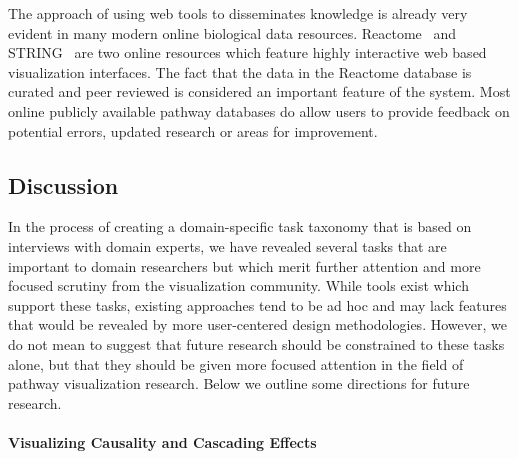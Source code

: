 \documentclass[twocolumn]{bmcart}%
\begin{document}
The approach of using web tools to disseminates knowledge is already very evident in many modern online biological data resources.
Reactome~\cite{croft2014reactome} and STRING~\cite{STRING2005} are two online resources which feature highly interactive web based visualization interfaces.
The fact that the data in the Reactome database is curated and peer reviewed is considered an important feature of the system.
Most online publicly available pathway databases do allow users to provide feedback on potential errors, updated research or areas for improvement.

\subsection*{Discussion}

In the process of creating a domain-specific task taxonomy that is based on interviews with domain experts, we have revealed several tasks that are important to domain researchers but which merit further attention and more focused scrutiny from the visualization community.
While tools exist which support these tasks, existing approaches tend to be ad hoc and may lack features that would be revealed by more user-centered design methodologies.
However, we do not mean to suggest that future research should be constrained to these tasks alone, but that they should be given more focused attention in the field of pathway visualization research. Below we outline some directions for future research.


\paragraph{Visualizing Causality and Cascading Effects}
\end{document}

